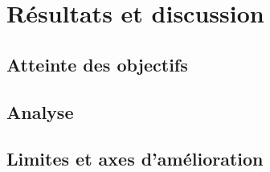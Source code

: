 \section{Résultats et discussion}
\label{sec:resultats}

\subsection{Atteinte des objectifs}

\subsection{Analyse}

\subsection{Limites et axes d'amélioration}
